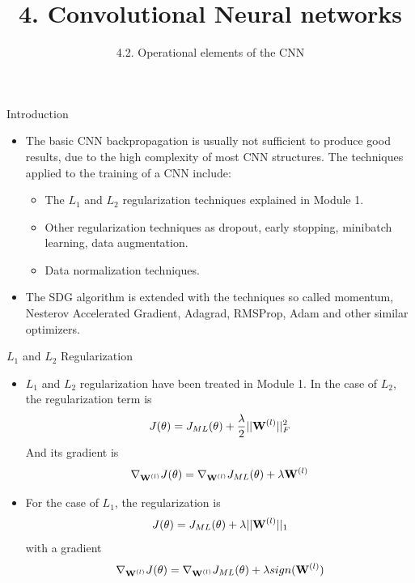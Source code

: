 \documentclass{beamer}
\title{4. Convolutional Neural networks}
\subtitle{4.2. Operational elements of the CNN}
\begin{document}
\maketitle
\begin{frame}{Introduction}
 \begin{itemize}
\item The basic CNN backpropagation is usually not sufficient to produce good results, due to the high complexity of most CNN structures. The techniques applied to the training of a CNN include:
\begin{itemize}
 \item The $L_1$ and $L_2$ regularization techniques explained in Module 1. 
 \item Other regularization techniques as dropout, early stopping, minibatch learning, data augmentation. 
 \item Data normalization techniques.
\end{itemize}
\item The SDG algorithm is extended with the techniques so called momentum, Nesterov Accelerated Gradient, Adagrad, RMSProp, Adam and other similar optimizers.  
\end{itemize}
\end{frame}

\begin{frame}{$L_1$ and $L_2$ Regularization}
    \begin{itemize}
        \item $L_1$ and $L_2$ regularization have been treated in Module 1. 
        In the case of $L_2$, the regularization term is 
\begin{equation}
    J(\theta) = J_{ML}(\theta) + \frac{\lambda}{2}||{\bf W}^{(l)}||^2_F
\end{equation}
And its gradient is
\begin{equation}
    \nabla_{{\bf W}^{(l)}}J(\theta) = \nabla_{{\bf W}^{(l)}}J_{ML}(\theta) + \lambda{\bf W}^{(l)}
\end{equation}
\item For the case of $L_1$, the regularization is
\begin{equation}
    J(\theta) = J_{ML}(\theta) + \lambda||{\bf W}^{(l)}||_1
\end{equation}
with a gradient 
\begin{equation}
    \nabla_{{\bf W}^{(l)}}J(\theta) = \nabla_{{\bf W}^{(l)}}J_{ML}(\theta) + \lambda sign({\bf W}^{(l)})
\end{equation}

    \end{itemize}
\end{frame}
\end{document}
